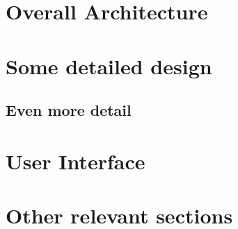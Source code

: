 \section{Overall Architecture}


\section{Some detailed design}

\subsection{Even more detail}

\section{User Interface}

\section{Other relevant sections}